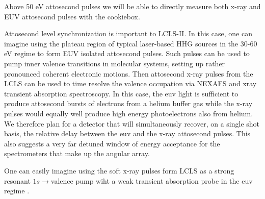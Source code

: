 Above 50 eV attosecond pulses we will be able to directly measure both x-ray and EUV attosecond pulses with the cookiebox.

Attosecond level synchronization is important to LCLS-II.
In this case, one can imagine using the plateau region of typical laser-based HHG sources in the 30-60 eV regime to form EUV isolated attosecond pulses.
Such pulses can be used to pump inner valence transitions in molecular systems, setting up rather pronounced coherent electronic motions.
Then attosecond x-ray pulses from the LCLS can be used to time resolve the valence occupation via NEXAFS and xray transient absorption spectroscopy.
In this case, the euv light is sufficient to produce attosecond bursts of electrons from a helium buffer gas while the x-ray pulses would equally well produce high energy photoelectrons also from helium.
We therefore plan for a detector that will simultaneously recover, on a single shot basis, the relative delay between the euv and the x-ray attosecond pulses.
This also suggests a very far detuned window of energy acceptance for the spectrometers that make up the angular array.

One can easily imagine using the soft x-ray pulses form LCLS as a strong resonant $1s\rightarrow$valence pump wiht a weak transient absorption probe in the euv regime \cite{Biegert2014,Biegert2016,WornerSci2017}.
